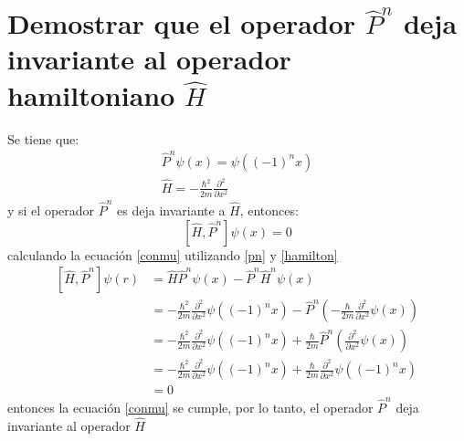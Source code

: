 \documentclass[12pt,letterpaper]{report}
\begin{document}
\section*{Demostrar que el operador $\hat{P}^n$ deja invariante al operador hamiltoniano $\hat{H}$}
Se tiene que:
\begin{align}
    \label{pn}
    \hat{P}^n \psi(x)=\psi((-1)^n x )\\
    \label{hamilton}
    \hat{H}= -\frac{\hbar^2 }{2m}  \frac{\partial^2}{\partial x^2} 
\end{align}
y si el operador $\hat{P}^n$ es deja invariante a $\hat{H}$, entonces:
\begin{equation}
    \label{conmu}
    \left[\hat{H},\hat{P}^n \right] \psi(x)=0
\end{equation}
calculando la ecuación \ref{conmu} utilizando \ref{pn} y \ref{hamilton}
\begin{align*}
    \left[\hat{H},\hat{P}^n \right] \psi(r) & = \hat{H}\hat{P}^n \psi(x) - \hat{P}^n\hat{H}^n \psi(x) \\
    & =-\frac{\hbar^2 }{2m}  \frac{\partial^2}{\partial x^2} \psi((-1)^n x) - \hat{P}^n \left(-\frac{\hbar}{2m} \frac{\partial^2 }{\partial x^2}\psi(x) \right)\\
    & =-\frac{\hbar^2 }{2m}  \frac{\partial^2}{\partial x^2} \psi((-1)^n x) + \frac{\hbar}{2m}\hat{P}^n \left( \frac{\partial^2 }{\partial x^2}\psi(x) \right)\\
    & =-\frac{\hbar^2 }{2m}  \frac{\partial^2}{\partial x^2} \psi((-1)^n x) + \frac{\hbar}{2m}\frac{\partial^2 }{\partial x^2}\psi((-1)^nx)\\
    &= 0
\end{align*}
entonces la ecuación \ref{conmu} se cumple, por lo tanto, el operador $\hat{P}^n$ deja invariante al operador $\hat{H}$
\end{document}
